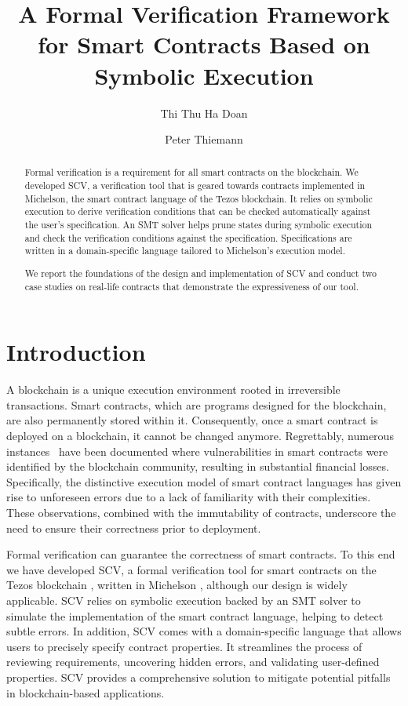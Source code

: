 \documentclass[a4paper,USenglish,cleveref, autoref,anonymous]{lipics-v2021}
\title{A Formal Verification Framework for Smart Contracts Based on Symbolic Execution} %
\author{Thi Thu Ha Doan}{University of Freiburg,
  Germany}{doanha@informatik.uni-freiburg.de}{https://orcid.org/0000−0001−7524−4497}{Supported
by the Tezos Foundation, grant COOC }%
\author{Peter Thiemann}{University of Freiburg, Germany}{thiemann@informatik.uni-freiburg.de}{https://orcid.org/0000−0002−9000−1239}{}
\begin{document}
\maketitle

\begin{abstract}
Formal verification is a requirement for all smart
contracts on the blockchain. We developed SCV, a verification tool
that is geared towards contracts implemented in Michelson, the smart
contract language of the Tezos blockchain. It relies on symbolic execution to
derive verification conditions that can be checked automatically against the user's
specification. An SMT solver helps prune states during symbolic
execution and check the verification conditions against the
specification. Specifications are written in a domain-specific
language tailored to Michelson's execution model.

We report the foundations of the design and implementation of SCV and
conduct two case studies on real-life contracts that demonstrate the
expressiveness of our tool.
\end{abstract}

\section{Introduction}
\label{sec:introduction}

A blockchain is a unique execution environment rooted in
irreversible transactions. Smart contracts, which are programs
designed for the blockchain, are also permanently stored within
it. Consequently, once a smart contract is deployed on a blockchain,
it cannot be changed anymore. Regrettably, numerous
instances~\cite{dao,wallethack} have been documented where
vulnerabilities in smart contracts were 
identified by the blockchain community, resulting in substantial
financial losses. Specifically, the distinctive execution model of
smart contract languages has given rise to unforeseen errors due to a
lack of familiarity with their complexities. These observations,
combined with the immutability of contracts, underscore the need
to ensure their correctness prior to deployment.

Formal verification can guarantee the correctness of smart contracts.
To this end we have developed SCV, a formal
verification tool for smart contracts on the Tezos blockchain \cite{tezos-whitepaper}, written in
Michelson \cite{michelson}, although our design is widely applicable. SCV relies on
symbolic execution backed by an SMT solver to simulate the
implementation of the smart contract language, helping to detect 
subtle errors. In addition, SCV comes with a domain-specific language that
allows users to precisely specify contract properties.
It streamlines the process of reviewing requirements,
uncovering hidden errors, and validating user-defined properties.
SCV provides a comprehensive solution to
mitigate potential pitfalls in blockchain-based applications. 
\end{document}
